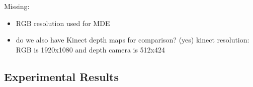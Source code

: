 Missing:
%
\begin{itemize}
\item RGB resolution used for MDE
\item do we also have Kinect depth maps for comparison? (yes) kinect resolution: RGB is 1920x1080 and depth camera is 512x424
\end{itemize}

\subsection{Experimental Results}
